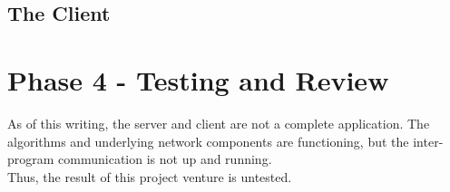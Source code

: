 \subsection{The Client}

\section{Phase 4 - Testing and Review}
As of this writing, the server and client are not a complete application. The
algorithms and underlying network components are functioning, but the
inter-program communication is not up and running. \\
Thus, the result of this project venture is untested.

